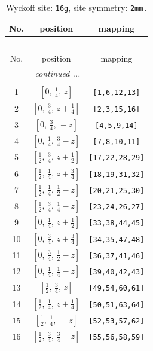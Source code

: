 \documentclass[fleqn,8pt]{jsarticle}
\begin{document}
\renewcommand{\arraystretch}{1.2}
\begin{longtable}{ccc}
\caption{Wyckoff site: {\tt 16g}, site symmetry: {\tt 2mm.}}
 \\
 \hline \hline
No. & position & mapping \\ \hline \endfirsthead

\multicolumn{2}{l}{\tablename\ \thetable{}} \\
 \hline \hline
No. & position & mapping \\ \hline \endhead

 \hline \hline
\multicolumn{2}{r}{\footnotesize\it continued ...} \\ \endfoot

 \hline \hline
\multicolumn{2}{r}{} \\ \endlastfoot

1 & $\left[ 0,\, \frac{1}{4},\, z \right]$ & {\tt [1,6,12,13]} \\ \hline
2 & $\left[ 0,\, \frac{3}{4},\, z + \frac{1}{4} \right]$ & {\tt [2,3,15,16]} \\ \hline
3 & $\left[ 0,\, \frac{3}{4},\, - z \right]$ & {\tt [4,5,9,14]} \\ \hline
4 & $\left[ 0,\, \frac{1}{4},\, \frac{3}{4} - z \right]$ & {\tt [7,8,10,11]} \\ \hline
5 & $\left[ \frac{1}{2},\, \frac{3}{4},\, z + \frac{1}{2} \right]$ & {\tt [17,22,28,29]} \\ \hline
6 & $\left[ \frac{1}{2},\, \frac{1}{4},\, z + \frac{3}{4} \right]$ & {\tt [18,19,31,32]} \\ \hline
7 & $\left[ \frac{1}{2},\, \frac{1}{4},\, \frac{1}{2} - z \right]$ & {\tt [20,21,25,30]} \\ \hline
8 & $\left[ \frac{1}{2},\, \frac{3}{4},\, \frac{1}{4} - z \right]$ & {\tt [23,24,26,27]} \\ \hline
9 & $\left[ 0,\, \frac{1}{4},\, z + \frac{1}{2} \right]$ & {\tt [33,38,44,45]} \\ \hline
10 & $\left[ 0,\, \frac{3}{4},\, z + \frac{3}{4} \right]$ & {\tt [34,35,47,48]} \\ \hline
11 & $\left[ 0,\, \frac{3}{4},\, \frac{1}{2} - z \right]$ & {\tt [36,37,41,46]} \\ \hline
12 & $\left[ 0,\, \frac{1}{4},\, \frac{1}{4} - z \right]$ & {\tt [39,40,42,43]} \\ \hline
13 & $\left[ \frac{1}{2},\, \frac{3}{4},\, z \right]$ & {\tt [49,54,60,61]} \\ \hline
14 & $\left[ \frac{1}{2},\, \frac{1}{4},\, z + \frac{1}{4} \right]$ & {\tt [50,51,63,64]} \\ \hline
15 & $\left[ \frac{1}{2},\, \frac{1}{4},\, - z \right]$ & {\tt [52,53,57,62]} \\ \hline
16 & $\left[ \frac{1}{2},\, \frac{3}{4},\, \frac{3}{4} - z \right]$ & {\tt [55,56,58,59]} \\
\end{longtable}
\end{document}
